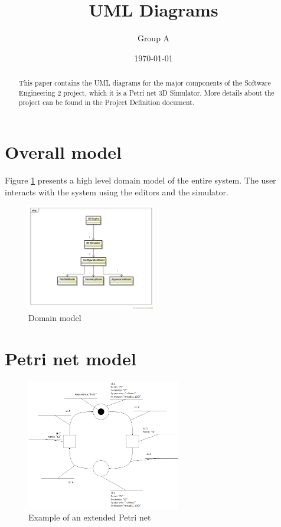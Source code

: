 \documentclass[11pt]{article}   %
\title{UML Diagrams\\ \epns}
\author{Group A}
\date{\today}
\begin{document}
\maketitle

\begin{abstract}
This paper contains the UML diagrams for the major components of the Software Engineering 2 project, which it is a Petri net 3D Simulator. More details about the project can be found in the Project Definition document.
\end{abstract}

\tableofcontents \newpage

\section{Overall model}

Figure \ref{fig:domain-model} presents a high level domain model of the entire system. The user interacts with the system using the editors and the simulator.

\begin{figure}[htp]
\begin{center}
  \includegraphics[width=0.5\textwidth]{image/domain_model.png}
  \caption{Domain model}
  \label{fig:domain-model}
\end{center}
\end{figure}

\newpage
\section{Petri net model}

\begin{figure}[htp]
\begin{center}
  \includegraphics[width=0.6\textwidth]{image/example_petrinet.png}
  \caption{Example of an extended Petri net}
  \label{fig:extended_petrinet}
\end{center}
\end{figure}
\end{document}
